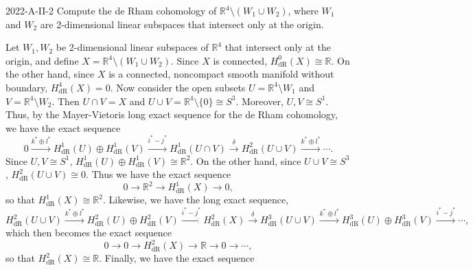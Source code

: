 \documentclass{article}
\begin{document}
	
	\begin{prb}{2022-A-II-2}
		Compute the de Rham cohomology of $\mathbb{R}^{4} \setminus (W_{1} \cup W_{2})$, where $W_{1}$ and $W_{2}$ are 2-dimensional linear subspaces that intersect only at the origin. 
	\end{prb}
	Let $W_{1}, W_{2}$ be 2-dimensional linear subspaces of $\mathbb{R}^{4}$ that intersect only at the origin, and define $X = \mathbb{R}^{4} \setminus (W_{1} \cup W_{2})$. Since $X$ is connected, $H^{0}_{\text{dR}}(X) \cong \mathbb{R}$. On the other hand, since $X$ is a connected, noncompact smooth manifold without boundary, $H^{4}_{\text{dR}}(X) = 0$. Now consider the open subsets $U = \mathbb{R}^{4}\setminus W_{1}$ and $V = \mathbb{R}^{4}\setminus W_{2}$. Then $U \cap V = X$ and $U \cup V = \mathbb{R}^{4} \setminus \{0\} \cong S^{3}$. Moreover, $U, V \cong S^{1}$. Thus, by the Mayer-Vietoris long exact sequence for the de Rham cohomology, we have the exact sequence 
	\begin{equation*}
		0 \xrightarrow{k^{\ast} \oplus l^{\ast}} H^{1}_{\text{dR}}(U) \oplus H^{1}_{\text{dR}}(V) \xrightarrow{i^{\ast} - j^{\ast}} H^{1}_{\text{dR}}(U \cap V) \xrightarrow{\delta} H^{2}_{\text{dR}}(U \cup V) \xrightarrow{k^{\ast} \oplus l^{\ast}} \dotsm.  
	\end{equation*}
	Since $U, V \cong S^{1}$, $H^{1}_{\text{dR}}(U) \oplus H^{1}_{\text{dR}}(V) \cong \mathbb{R}^{2}$. On the other hand, since $U \cup V \cong S^{3}$, $H^{2}_{\text{dR}}(U \cup V) \cong 0$. Thus we have the exact sequence 
	\begin{equation*}
		0 \to \mathbb{R}^{2} \to H^{1}_{\text{dR}}(X) \to 0,
	\end{equation*}
	so that $H^{1}_{\text{dR}}(X) \cong \mathbb{R}^{2}$. Likewise, we have the long exact sequence,
	\begin{equation*}
		H^{2}_{\text{dR}}(U \cup V) \xrightarrow{k^{\ast} \oplus l^{\ast}} H^{2}_{\text{dR}}(U) \oplus H^{2}_{\text{dR}}(V) \xrightarrow{i^{\ast} - j^{\ast}} H^{2}_{\text{dR}}(X) \xrightarrow{\delta} H^{3}_{\text{dR}}(U \cup V) \xrightarrow{k^{\ast} \oplus l^{\ast}} H^{3}_{\text{dR}}(U) \oplus H^{3}_{\text{dR}}(V) \xrightarrow{i^\ast - j^\ast} \dotsm , 
	\end{equation*}
	which then becomes the exact sequence 
	\begin{equation*}
		0 \to 0 \to H^{2}_{\text{dR}}(X) \to \mathbb{R} \to 0 \to \dotsm, 
	\end{equation*}
	so that $H^{2}_{\text{dR}}(X) \cong \mathbb{R}$. Finally, we have the exact sequence 
\end{document}
